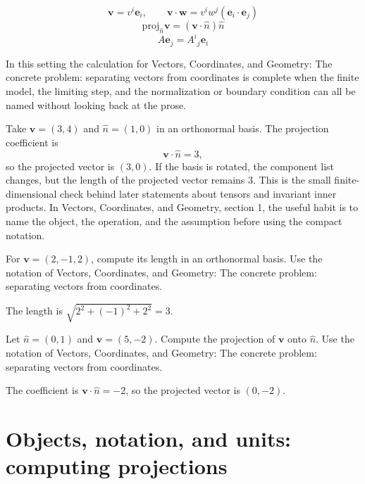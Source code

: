 \[
  \bm v=v^i\bm e_i,\qquad \bm v\cdot\bm w=v^iw^j(\bm e_i\cdot\bm e_j)
\]
\[
  \mathrm{proj}_{\hat n}\bm v=(\bm v\cdot\hat n)\hat n
\]
\[
  A\bm e_j=A^i{}_j\bm e_i
\]

In this setting the calculation for Vectors, Coordinates, and Geometry: The concrete problem: separating vectors from coordinates is complete when the finite model, the limiting step, and the normalization or boundary condition can all be named without looking back at the prose.




\begin{example}
Take \(\bm v=(3,4)\) and \(\hat n=(1,0)\) in an orthonormal basis.  The projection coefficient is
\[
  \bm v\cdot\hat n=3,
\]
so the projected vector is \((3,0)\).  If the basis is rotated, the component list changes, but the length of the projected vector remains \(3\).  This is the small finite-dimensional check behind later statements about tensors and invariant inner products.  In Vectors, Coordinates, and Geometry, section 1, the useful habit is to name the object, the operation, and the assumption before using the compact notation.
\end{example}



\begin{exercise}
For \(\bm v=(2,-1,2)\), compute its length in an orthonormal basis.  Use the notation of Vectors, Coordinates, and Geometry: The concrete problem: separating vectors from coordinates.
\begin{answer}
The length is \(\sqrt{2^2+(-1)^2+2^2}=3\).
\end{answer}
\end{exercise}

\begin{exercise}
Let \(\hat n=(0,1)\) and \(\bm v=(5,-2)\).  Compute the projection of \(\bm v\) onto \(\hat n\).  Use the notation of Vectors, Coordinates, and Geometry: The concrete problem: separating vectors from coordinates.
\begin{answer}
The coefficient is \(\bm v\cdot\hat n=-2\), so the projected vector is \((0,-2)\).
\end{answer}
\end{exercise}



\section{Objects, notation, and units: computing projections}

